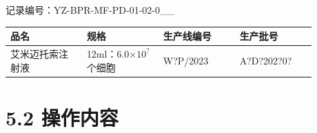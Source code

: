 \documentclass[UTF8,10pt,a4paper,fontset=fandol]{ctexart}
\newcommand{\fieldvalue}[1]{#1}
\newcommand{\handwritten}[1]{#1}
\begin{document}
记录编号：YZ-BPR-MF-PD-01-02-0\_\_  
\begin{tabular}{|p{0.22\linewidth}|p{0.22\linewidth}|p{0.22\linewidth}|p{0.22\linewidth}|}
\hline
品名 & 规格 & 生产线编号 & 生产批号 \\ \hline
艾米迈托索注射液 & 12ml：6.0$\times 10^{?}$个细胞 &
\fieldvalue{\handwritten{W?P/2023}} &
\fieldvalue{\handwritten{A?D?202?0?}} \\ \hline
\end{tabular}

\vspace{4pt}

\section*{5.2 操作内容}
\end{document}
